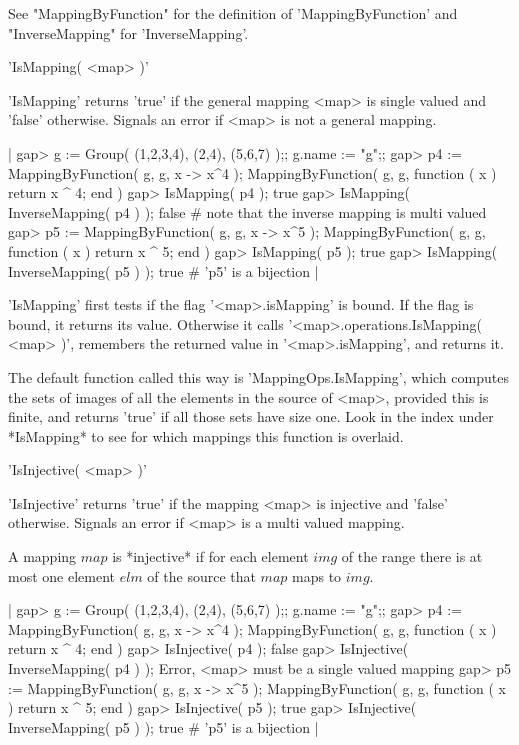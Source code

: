 See  "MappingByFunction"  for  the definition of  'MappingByFunction' and
"InverseMapping" for 'InverseMapping'.


'IsMapping( <map> )'

'IsMapping' returns 'true' if the general mapping <map>  is single valued
and  'false'  otherwise.   Signals  an  error if  <map> is  not a general
mapping.

|    gap> g := Group( (1,2,3,4), (2,4), (5,6,7) );;  g.name := "g";;
    gap> p4 := MappingByFunction( g, g, x -> x^4 );
    MappingByFunction( g, g, function ( x )
        return x ^ 4;
    end )
    gap> IsMapping( p4 );
    true
    gap> IsMapping( InverseMapping( p4 ) );
    false    # note that the inverse mapping is multi valued
    gap> p5 := MappingByFunction( g, g, x -> x^5 );
    MappingByFunction( g, g, function ( x )
        return x ^ 5;
    end )
    gap> IsMapping( p5 );
    true
    gap> IsMapping( InverseMapping( p5 ) );
    true    # 'p5' is a bijection |

'IsMapping' first tests if the  flag '<map>.isMapping'  is bound.  If the
flag   is   bound,   it   returns  its   value.    Otherwise   it   calls
'<map>.operations.IsMapping( <map> )',  remembers the  returned  value in
'<map>.isMapping', and returns it.

The default  function  called  this way is  'MappingOps.IsMapping', which
computes the sets of images of  all the elements in  the source of <map>,
provided  this is finite,  and returns 'true' if all those sets have size
one.  Look in the index under *IsMapping* to see for  which mappings this
function is overlaid.


'IsInjective( <map> )'

'IsInjective'  returns  'true'  if  the  mapping  <map> is  injective and
'false' otherwise.  Signals an error if <map> is a multi valued mapping.

A mapping $map$  is *injective* if for  each element  $img$  of the range
there  is at most one  element $elm$  of the  source that  $map$ maps  to
$img$.

|    gap> g := Group( (1,2,3,4), (2,4), (5,6,7) );;  g.name := "g";;
    gap> p4 := MappingByFunction( g, g, x -> x^4 );
    MappingByFunction( g, g, function ( x )
        return x ^ 4;
    end )
    gap> IsInjective( p4 );
    false
    gap> IsInjective( InverseMapping( p4 ) );
    Error, <map> must be a single valued mapping
    gap> p5 := MappingByFunction( g, g, x -> x^5 );
    MappingByFunction( g, g, function ( x )
        return x ^ 5;
    end )
    gap> IsInjective( p5 );
    true
    gap> IsInjective( InverseMapping( p5 ) );
    true    # 'p5' is a bijection |

